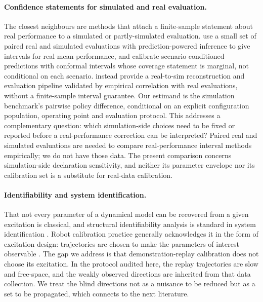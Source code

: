 \documentclass[pdflatex,iicol,sn-apa]{sn-jnl}
\theoremstyle{remark}
\begin{document}
\paragraph{Confidence statements for simulated and real evaluation.}
The closest neighbours are methods that attach a finite-sample statement about real
performance to a simulated or partly-simulated evaluation. \citet{suresim2025} use a small set of
paired real and simulated evaluations with prediction-powered inference to give intervals for real
mean performance, and \citet{scape2026} calibrate scenario-conditioned predictions with conformal intervals whose coverage statement is marginal, not conditional on each scenario. \citet{polaris2025} instead provide a real-to-sim reconstruction and evaluation pipeline
validated by empirical correlation with real evaluations, without a finite-sample interval guarantee. Our estimand is the simulation benchmark's
pairwise policy difference, conditional on an explicit configuration population, operating point
and evaluation protocol. This addresses a complementary question: which simulation-side choices
need to be fixed or reported before a real-performance correction can be interpreted? Paired real
and simulated evaluations are needed to compare real-performance interval methods empirically;
we do not have those data. The present comparison concerns simulation-side declaration sensitivity,
and neither its parameter envelope nor its calibration set is a substitute for real-data calibration.

\paragraph{Identifiability and system identification.}
That not every parameter of a dynamical model can be recovered from a given excitation is classical,
and structural identifiability analysis is standard in system identification \citep{ljung1999system,
bellman1970structural}. Robot calibration practice generally acknowledges it in the form of
excitation design: trajectories are chosen to make the parameters of interest observable
\citep{swevers1997optimal}. The gap we address is that demonstration-replay calibration does not choose its excitation. In the protocol audited here, the replay trajectories are slow and free-space, and the weakly observed directions are inherited from that data collection. We treat the
blind directions not as a nuisance to be reduced but as a set to be propagated, which connects to
the next literature.
\end{document}
